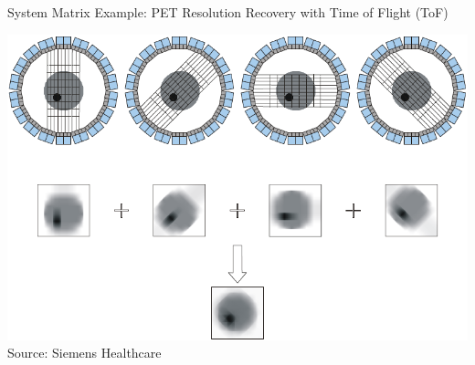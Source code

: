 

\begin{frame}{System Matrix Example: PET Resolution Recovery with Time of Flight (ToF)}
    \begin{center}\includegraphics[height=0.7\textheight]{images/pet_tof}\\
        {\scriptsize Source: Siemens Healthcare}\\
    \end{center}
\end{frame}



